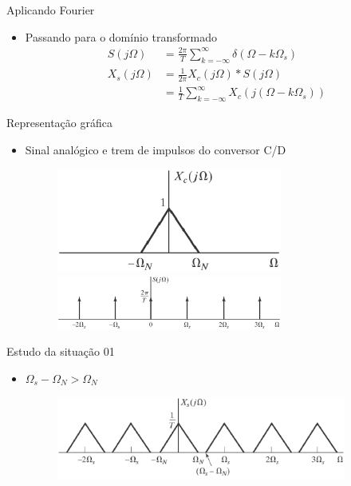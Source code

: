 \documentclass[
size=11pt,
paper=screen,
mode=present,
display=slidesnotes,
style=paintings,
nopagebreaks,
blackslide,
fleqn]{powerdot}
\begin{document}
\begin{slide}{Aplicando Fourier}
\begin{itemize}
   \item Passando para o dom\'inio transformado
   \begin{align}
      S(j\Omega)  &= \frac{2\pi}{T}\sum_{k=-\infty}^{\infty}\delta(\Omega-k\Omega_s)\\
      X_s(j\Omega)&= \frac{1}{2\pi}X_c(j\Omega)*S(j\Omega)\\
                 &= \frac{1}{T}\sum_{k=-\infty}^{\infty}X_c(j(\Omega-k\Omega_s))
   \end{align}
\end{itemize}
\end{slide}

\begin{slide}{Representa\c c\~ao gráfica}
\begin{itemize}
   \item Sinal analógico e trem de impulsos do conversor C/D 
   \begin{figure}
      \centering
      \includegraphics[width=0.7\textwidth]{figs/espectro01a.eps}
      \includegraphics[width=0.7\textwidth]{figs/espectro01b.eps}
   \end{figure}
\end{itemize}
\end{slide}

\begin{slide}{Estudo da situação 01}
\begin{itemize}
   \item $\Omega_s-\Omega_N>\Omega_N$
   \begin{figure}
      \centering
      \includegraphics[width=0.9\textwidth]{figs/situacao01.eps}
   \end{figure}
\end{itemize}
\end{slide}
\end{document}
